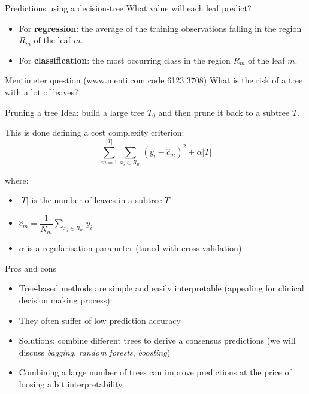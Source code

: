 \documentclass[notes]{beamer}          %
\begin{document}
\begin{frame}{Predictions using a decision-tree}
What value will each leaf predict?
\begin{itemize}
	\item For \textbf{regression}: the average of the  training observations falling in the region $R_m$ of the leaf $m$.
		\item For \textbf{classification}: the most occurring class in the region $R_m$ of the leaf $m$.
\end{itemize}

\vspace{0.5cm}

\end{frame}

\begin{frame}{Mentimeter question (www.menti.com code 6123 3708)}
What is the risk of a tree with a lot of leaves?
\end{frame}

\begin{frame}{Pruning a tree}
Idea: build a large tree $T_0$ and then prune it back to a subtree $T$.

This is done defining a cost complexity criterion:
$$\sum_{m=1}^{|T|}\sum_{x_i\in R_m}(y_i-\hat c_m)^2+\alpha|T|$$

where:
\begin{itemize}
\item $|T|$ is the number of leaves in a subtree $T$
\item $ \hat c_m = \dfrac{1}{N_m}\sum_{x_i\in R_m}y_i$
\item $\alpha$ is a regularisation parameter (tuned with cross-validation)
\end{itemize}
\end{frame}

\begin{frame}{Pros and cons}
\begin{itemize}
 \item Tree-based methods are simple and easily interpretable (appealing for clinical decision making process)
 \item They often suffer of low prediction accuracy
 \item Solutions: combine different trees to derive a consensus predictions (we will discuss  \textit{bagging}, \textit{random forests}, \textit{boosting})
 \item Combining a large number of trees can improve predictions at the price of loosing a bit interpretability
\end{itemize}
\end{frame}
\end{document}
